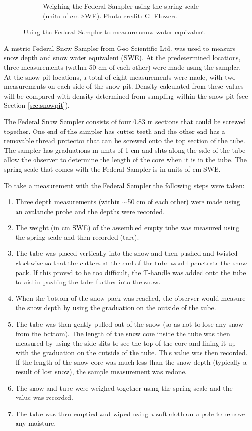 \documentclass{sfuthesis}
\begin{document}
\begin{figure}
\begin{subfigure}[b]{0.55\textwidth}
        \caption{Weighing the Federal Sampler using the spring scale (units of cm SWE). Photo credit: G. Flowers}
        \label{photo_swe2}
    \end{subfigure}

    \caption{Using the Federal Sampler to measure snow water equivalent}
    \label{photo_swe}
\end{figure}
 
A metric Federal Snow Sampler from Geo Scientific Ltd. was used to measure snow depth and snow water equivalent (SWE). At the predetermined locations, three measurements (within 50 cm of each other) were made using the sampler. At the snow pit locations, a total of eight measurements were made, with two measurements on each side of the snow pit. Density calculated from these values will be compared with density determined from sampling within the snow pit (see Section \ref{sec:snowpit}). 

The Federal Snow Sampler consists of four 0.83 m sections that could be screwed together. One end of the sampler has cutter teeth and the other end has a removable thread protector that can be screwed onto the top section of the tube. The sampler has graduations in units of 1 cm and slits along the side of the tube allow the observer to determine the length of the core when it is in the tube. The spring scale that comes with the Federal Sampler is in units of cm SWE.  

To take a measurement with the Federal Sampler the following steps were taken:
\begin{enumerate}
\item Three depth measurements (within $\sim$50 cm of each other) were made using an avalanche probe and the depths were recorded.
\item The weight (in cm SWE) of the assembled empty tube was measured using the spring scale and then recorded (tare).
\item The tube was placed vertically into the snow and then pushed and twisted clockwise so that the cutters at the end of the tube would penetrate the snow pack. If this proved to be too difficult, the T-handle was added onto the tube to aid in pushing the tube further into the snow. 
\item When the bottom of the snow pack was reached, the observer would measure the snow depth by using the graduation on the outside of the tube.
\item The tube was then gently pulled out of the snow (so as not to lose any snow from the bottom). The length of the snow core inside the tube was then measured by using the side slits to see the top of the core and lining it up with the graduation on the outside of the tube. This value was then recorded. If the length of the snow core was much less than the snow depth (typically a result of lost snow), the sample measurement was redone.
\item The snow and tube were weighed together using the spring scale and the value was recorded.
\item The tube was then emptied and wiped using a soft cloth on a pole to remove any moisture. 
\end{enumerate}
\end{document}
